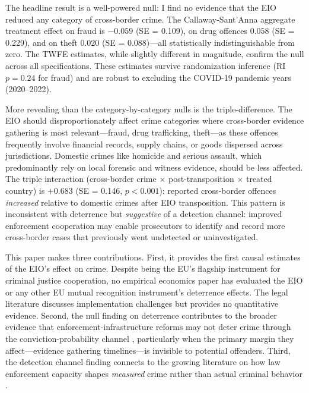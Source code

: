 \documentclass[12pt]{article}
\begin{document}
The headline result is a well-powered null: I find no evidence that the EIO reduced any category of cross-border crime. The Callaway-Sant'Anna aggregate treatment effect on fraud is $-0.059$ (SE = 0.109), on drug offences $0.058$ (SE = 0.229), and on theft $0.020$ (SE = 0.088)---all statistically indistinguishable from zero. The TWFE estimates, while slightly different in magnitude, confirm the null across all specifications. These estimates survive randomization inference (RI $p = 0.24$ for fraud) and are robust to excluding the COVID-19 pandemic years (2020--2022).

More revealing than the category-by-category nulls is the triple-difference. The EIO should disproportionately affect crime categories where cross-border evidence gathering is most relevant---fraud, drug trafficking, theft---as these offences frequently involve financial records, supply chains, or goods dispersed across jurisdictions. Domestic crimes like homicide and serious assault, which predominantly rely on local forensic and witness evidence, should be less affected. The triple interaction (cross-border crime $\times$ post-transposition $\times$ treated country) is $+0.683$ (SE = 0.146, $p < 0.001$): reported cross-border offences \textit{increased} relative to domestic crimes after EIO transposition. This pattern is inconsistent with deterrence but \textit{suggestive} of a detection channel: improved enforcement cooperation may enable prosecutors to identify and record more cross-border cases that previously went undetected or uninvestigated.

This paper makes three contributions. First, it provides the first causal estimates of the EIO's effect on crime. Despite being the EU's flagship instrument for criminal justice cooperation, no empirical economics paper has evaluated the EIO or any other EU mutual recognition instrument's deterrence effects. The legal literature discusses implementation challenges \citep{tosza2020eio, ruggeri2019eio} but provides no quantitative evidence. Second, the null finding on deterrence contributes to the broader evidence that enforcement-infrastructure reforms may not deter crime through the conviction-probability channel \citep{helland2007does, agan2023misdemeanor}, particularly when the primary margin they affect---evidence gathering timelines---is invisible to potential offenders. Third, the detection channel finding connects to the growing literature on how law enforcement capacity shapes \textit{measured} crime rather than actual criminal behavior \citep{chalfin2022criminal, mello2019more}.
\end{document}
